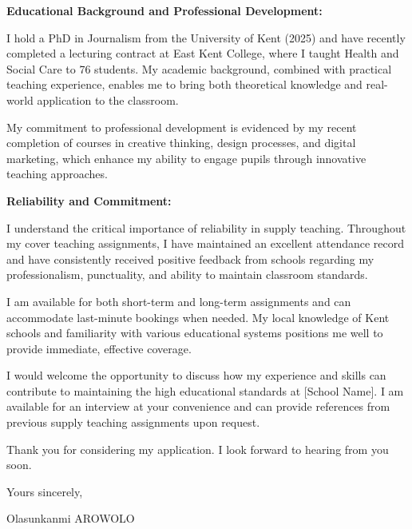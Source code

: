 \documentclass[11pt,a4paper]{article}
\begin{document}
\textbf{Educational Background and Professional Development:}

I hold a PhD in Journalism from the University of Kent (2025) and have recently completed a lecturing contract at East Kent College, where I taught Health and Social Care to 76 students. My academic background, combined with practical teaching experience, enables me to bring both theoretical knowledge and real-world application to the classroom.

My commitment to professional development is evidenced by my recent completion of courses in creative thinking, design processes, and digital marketing, which enhance my ability to engage pupils through innovative teaching approaches.

\textbf{Reliability and Commitment:}

I understand the critical importance of reliability in supply teaching. Throughout my cover teaching assignments, I have maintained an excellent attendance record and have consistently received positive feedback from schools regarding my professionalism, punctuality, and ability to maintain classroom standards.

I am available for both short-term and long-term assignments and can accommodate last-minute bookings when needed. My local knowledge of Kent schools and familiarity with various educational systems positions me well to provide immediate, effective coverage.

I would welcome the opportunity to discuss how my experience and skills can contribute to maintaining the high educational standards at [School Name]. I am available for an interview at your convenience and can provide references from previous supply teaching assignments upon request.

Thank you for considering my application. I look forward to hearing from you soon.

Yours sincerely,

\vspace{1cm}

Olasunkanmi AROWOLO
\end{document}
